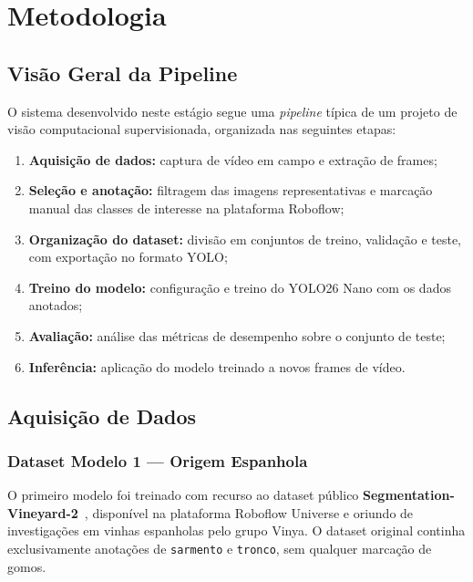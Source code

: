 \chapter{Metodologia}
\label{chap:metodologia}

\section{Visão Geral da Pipeline}

O sistema desenvolvido neste estágio segue uma \textit{pipeline} típica de um
projeto de visão computacional supervisionada, organizada nas seguintes
etapas:

\begin{enumerate}
  \item \textbf{Aquisição de dados:} captura de vídeo em campo e extração de
    frames;
  \item \textbf{Seleção e anotação:} filtragem das imagens representativas e
    marcação manual das classes de interesse na plataforma Roboflow;
  \item \textbf{Organização do dataset:} divisão em conjuntos de treino,
    validação e teste, com exportação no formato YOLO;
  \item \textbf{Treino do modelo:} configuração e treino do YOLO26 Nano com
    os dados anotados;
  \item \textbf{Avaliação:} análise das métricas de desempenho sobre o
    conjunto de teste;
  \item \textbf{Inferência:} aplicação do modelo treinado a novos frames de
    vídeo.
\end{enumerate}

\section{Aquisição de Dados}

\subsection{Dataset Modelo 1 — Origem Espanhola}

O primeiro modelo foi treinado com recurso ao dataset público
\textbf{Segmentation-Vineyard-2}~\cite{vinya2024segvineyard}, disponível na
plataforma Roboflow Universe e oriundo de investigações em vinhas espanholas
pelo grupo Vinya. O dataset original continha exclusivamente anotações de
\texttt{sarmento} e \texttt{tronco}, sem qualquer marcação de gomos.

